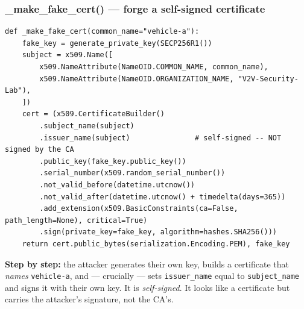 \documentclass[11pt,a4paper]{report}
\begin{document}
\subsubsection*{\_make\_fake\_cert() --- forge a self-signed certificate}
\begin{lstlisting}[style=py,caption={mitm\_attack.py --- building a fake (self-signed) certificate.}]
def _make_fake_cert(common_name="vehicle-a"):
    fake_key = generate_private_key(SECP256R1())
    subject = x509.Name([
        x509.NameAttribute(NameOID.COMMON_NAME, common_name),
        x509.NameAttribute(NameOID.ORGANIZATION_NAME, "V2V-Security-Lab"),
    ])
    cert = (x509.CertificateBuilder()
        .subject_name(subject)
        .issuer_name(subject)               # self-signed -- NOT signed by the CA
        .public_key(fake_key.public_key())
        .serial_number(x509.random_serial_number())
        .not_valid_before(datetime.utcnow())
        .not_valid_after(datetime.utcnow() + timedelta(days=365))
        .add_extension(x509.BasicConstraints(ca=False, path_length=None), critical=True)
        .sign(private_key=fake_key, algorithm=hashes.SHA256()))
    return cert.public_bytes(serialization.Encoding.PEM), fake_key
\end{lstlisting}
\textbf{Step by step:} the attacker generates their own key, builds a certificate
that \emph{names} \texttt{vehicle-a}, and --- crucially --- sets
\texttt{issuer\_name} equal to \texttt{subject\_name} and signs it with their own
key. It is \emph{self-signed}. It looks like a certificate but carries the
attacker's signature, not the CA's.
\end{document}
